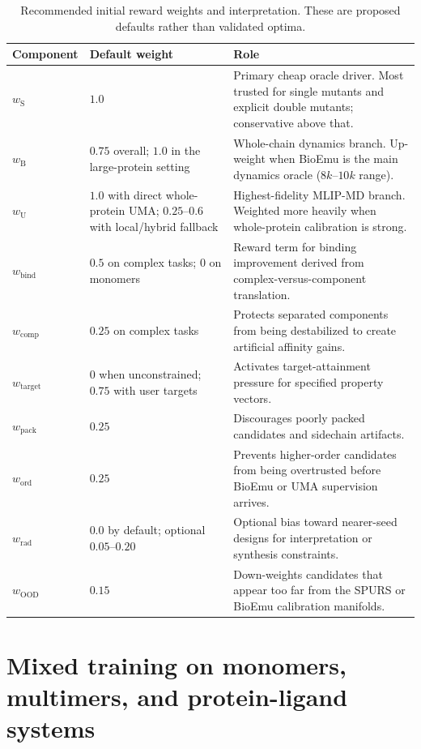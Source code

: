 \documentclass[11pt]{article}
\begin{document}
\begin{table}[H]
\centering
\caption{Recommended initial reward weights and interpretation. These are proposed defaults rather than validated optima.}
\label{tab:rewardweights}
\begin{tabularx}{\textwidth}{>{\raggedright\arraybackslash}p{} >{\raggedright\arraybackslash}p{} >{\raggedright\arraybackslash}X}
\toprule
Component & Default weight & Role \\
\midrule
$w_{\mathrm S}$ & $1.0$ & Primary cheap oracle driver. Most trusted for single mutants and explicit double mutants; conservative above that. \\
$w_{\mathrm B}$ & $0.75$ overall; $1.0$ in the large-protein setting & Whole-chain dynamics branch. Up-weight when BioEmu is the main dynamics oracle ($8k$--$10k$ range). \\
$w_{\mathrm U}$ & $1.0$ with direct whole-protein UMA; $0.25$--$0.6$ with local/hybrid fallback & Highest-fidelity MLIP-MD branch. Weighted more heavily when whole-protein calibration is strong. \\
$w_{\mathrm{bind}}$ & $0.5$ on complex tasks; $0$ on monomers & Reward term for binding improvement derived from complex-versus-component translation. \\
$w_{\mathrm{comp}}$ & $0.25$ on complex tasks & Protects separated components from being destabilized to create artificial affinity gains. \\
$w_{\mathrm{target}}$ & $0$ when unconstrained; $0.75$ with user targets & Activates target-attainment pressure for specified property vectors. \\
$w_{\mathrm{pack}}$ & $0.25$ & Discourages poorly packed candidates and sidechain artifacts. \\
$w_{\mathrm{ord}}$ & $0.25$ & Prevents higher-order candidates from being overtrusted before BioEmu or UMA supervision arrives. \\
$w_{\mathrm{rad}}$ & $0.0$ by default; optional $0.05$--$0.20$ & Optional bias toward nearer-seed designs for interpretation or synthesis constraints. \\
$w_{\mathrm{OOD}}$ & $0.15$ & Down-weights candidates that appear too far from the SPURS or BioEmu calibration manifolds. \\
\bottomrule
\end{tabularx}
\end{table}


\section{Mixed training on monomers, multimers, and protein-ligand systems}
\label{sec:mixedtraining}
\end{document}

